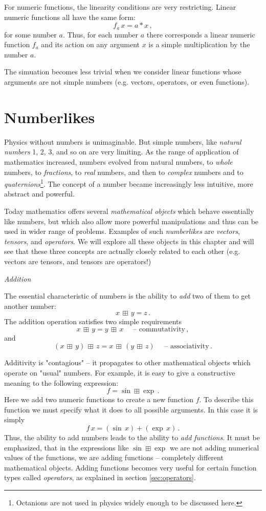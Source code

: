 For numeric functions, the linearity conditions are very restricting. Linear numeric functions all have the same form:
\[
f_a\,x=a*x\,,
\]
for some number $a$. Thus, for each number $a$ there corresponds a linear numeric function $f_a$ and its action on any argument $x$ is a simple multiplication by the number $a$.

The simuation becomes less trivial when we consider linear functions whose arguments are not simple numbers (e.g. vectors, operators, or even functions).


\section{Numberlikes}
Physics without numbers is unimaginable. But simple numbers, like \emph{natural numbers} 1, 2, 3, and so on are very limiting.  As the range of application of mathematics increased, numbers evolved from natural numbers, to \emph{whole} numbers, to \emph{fractions}, to \emph{real} numbers, and then to \emph{complex} numbers and to \emph{quaternions}\footnote{Octanions are not used in physics widely enough to be discussed here.}. The concept of a number became increasingly less intuitive, more abstract and powerful.

Today mathematics offers several \emph{mathematical objects} which behave essentially like numbers, but which also allow more powerful manipulations and thus can be used in wider range of problems. Examples of such \emph{numberlikes} are \emph{vectors}, \emph{tensors}, and \emph{operators}. We will explore all these objects in this chapter and will see that these three concepts are actually closely related to each other (e.g. vectors are tensors, and tensors are operators!)


\begin{flushleft}
	{\it Addition}
\end{flushleft}
The essential characteristic of numbers is the ability to \emph{add} two of them to get another number:
\[
x\,\boxplus\, y = z\,.
\]
The addition operation satisfies two simple requirements
\[
x\,\boxplus\, y = y\,\boxplus\, x\quad\textrm{ -- commutativity}\,,
\]
and
\[
(x\,\boxplus\, y)\,\boxplus\, z = x\,\boxplus\, (y\,\boxplus\, z) \quad\textrm{ -- associativity}\,.
\]


Additivity is "contagious" -- it propagates to other mathematical objects which operate on "usual" numbers. For example, it is easy to give a constructive meaning to the following expression:
\[
f = \sin\boxplus\exp\,.
\]
Here we add two numeric functions to create a new function $f$. To describe this function we must specify what it does to all possible arguments. In this case it is simply
\[
f\,x=(\sin\, x)+(\exp\, x)\,.
\]
Thus, the ability to add numbers leads to the ability to \emph{add functions}. It must be emphasized, that in the expressions like $\sin\boxplus\exp$ we are not adding numerical values of the functions, we are adding functions -- completely different mathematical objects. Adding functions becomes very useful for certain function types called \emph{operators}, as explained in section \ref{sec:operators}.

